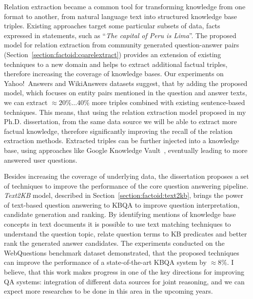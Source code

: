 Relation extraction became a common tool for transforming knowledge from one format to another, \eg from natural language text into structured knowledge base triples.
Existing approaches target some particular subsets of data, \eg facts expressed in statements, such as ``\textit{The capital of Peru is Lima}''.
The proposed model for relation extraction from community generated question-answer pairs (Section~\ref{section:factoid:cqarelextract}) provides an extension of existing techniques to a new domain and helps to extract additional factual triples, therefore increasing the coverage of knowledge bases.
Our experiments on Yahoo!~Answers and WikiAnswers datasets suggest, that by adding the proposed model, which focuses on entity pairs mentioned in the question and answer texts, we can extract $\approx 20\%...40\%$ more triples combined with existing sentence-based techniques.
This means, that using the relation extraction model proposed in my Ph.D. dissertation, from the same data source we will be able to extract more factual knowledge, therefore significantly improving the recall of the relation extraction methods.
Extracted triples can be further injected into a knowledge base, \eg using approaches like Google Knowledge Vault~\cite{Dong:2014:KVW:2623330.2623623}, eventually leading to more answered user questions.

Besides increasing the coverage of underlying data, the dissertation proposes a set of techniques to improve the performance of the core question answering pipeline.
\textit{Text2KB} model, described in Section~\ref{section:factoid:text2kb}, brings the power of text-based question answering to KBQA to improve question interpretation, candidate generation and ranking.
By identifying mentions of knowledge base concepts in text documents it is possible to use text matching techniques to understand the question topic, relate question terms to KB predicates and better rank the generated answer candidates.
The experiments conducted on the WebQuestions benchmark dataset demonstrated, that the proposed techniques can improve the performance of a state-of-the-art KBQA system by $\approx 8\%$.
I believe, that this work makes progress in one of the key directions for improving QA systems: integration of different data sources for joint reasoning, and we can expect more researches to be done in this area in the upcoming years.

